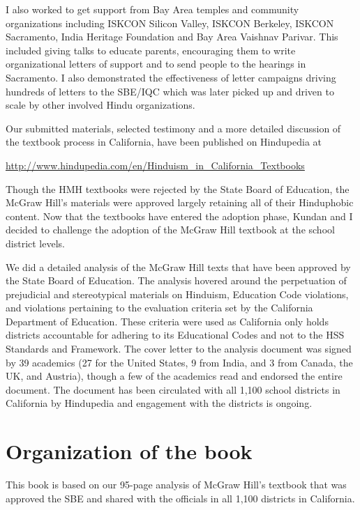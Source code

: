 I also worked to get support from Bay Area temples and community organizations including ISKCON Silicon Valley, ISKCON Berkeley, ISKCON Sacramento, India Heritage Foundation and Bay Area Vaishnav Parivar. This included giving talks to educate parents, encouraging them to write organizational letters of support and to send people to the hearings in Sacramento. I also demonstrated the effectiveness of letter campaigns driving hundreds of letters to the SBE/IQC which was later picked up and driven to scale by other involved Hindu organizations.

Our submitted materials, selected testimony and a more detailed discussion of the textbook process in California, have been published on Hindupedia at 

\url{http://www.hindupedia.com/en/Hinduism_in_California_Textbooks}

Though the HMH textbooks were rejected by the State Board of Education, the McGraw Hill’s materials were approved largely retaining all of their Hinduphobic content. Now that the textbooks have entered the adoption phase, Kundan and I decided to challenge the adoption of the McGraw Hill textbook at the school district levels. 

We did a detailed analysis of the McGraw Hill texts that have been approved by the State Board of Education. The analysis hovered around the perpetuation of prejudicial and stereotypical materials on Hinduism, Education Code violations, and violations pertaining to the evaluation criteria set by the California Department of Education. These criteria were used as California only holds districts accountable for adhering to its Educational Codes and not to the HSS Standards and Framework. The cover letter to the analysis document was signed by 39 academics (27 for the United States, 9 from India, and 3 from Canada, the UK, and Austria), though a few of the academics read and endorsed the entire document. The document has been circulated with all 1,100 school districts in California by Hindupedia and engagement with the districts is ongoing.

\section*{Organization of the book}
\vskip -5pt

This book is based on our 95-page analysis of McGraw Hill’s textbook that was approved the SBE and shared with the officials in all 1,100 districts in California. 

